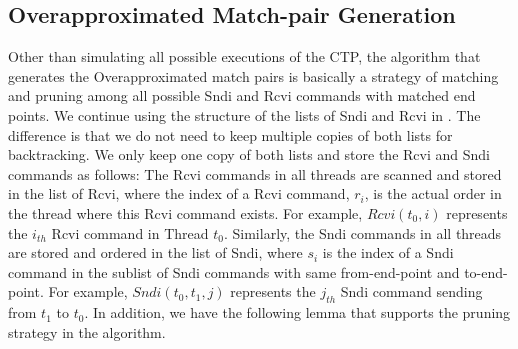\subsection{Overapproximated Match-pair Generation}

Other than simulating all possible executions of the CTP, the algorithm that generates the Overapproximated match pairs is basically a strategy of matching and pruning among all possible Sndi and Rcvi commands with matched end points. We continue using the structure of the lists of Sndi and Rcvi in . The difference is that we do not need to keep multiple copies of both lists for backtracking. We only keep one copy of both lists and store the Rcvi and Sndi commands as follows: The Rcvi commands in all threads are scanned and stored in the list of Rcvi, where the index of a Rcvi command, $r_i$, is the actual order in the thread where this Rcvi command exists. For example, $Rcvi(t_0, i)$ represents the $i_{th}$ Rcvi command in Thread $t_0$. Similarly, the Sndi commands in all threads are stored and ordered in the list of Sndi, where $s_i$ is the index of a Sndi command in the sublist of Sndi commands with same from-end-point and to-end-point. For example, $Sndi(t_0, t_1, j)$ represents the $j_{th}$ Sndi command sending from $t_1$ to $t_0$. In addition, we have the following lemma that supports the pruning strategy in the algorithm.

